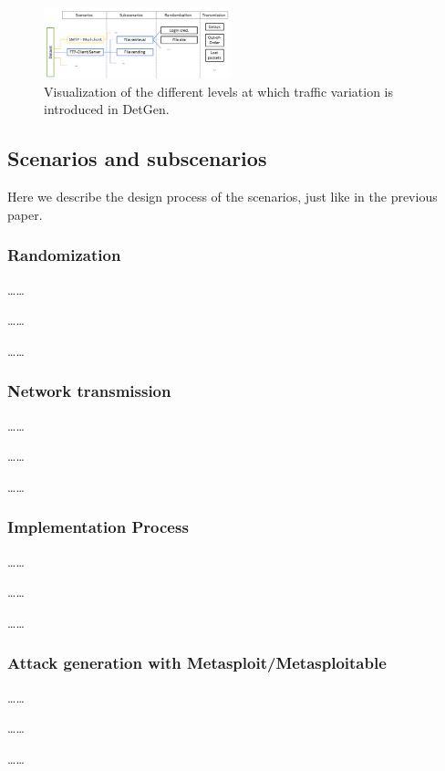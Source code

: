 \documentclass{article}
\begin{document}
\begin{figure}
 \centering 
 \includegraphics[width=0.480\textwidth]{images/scenario_branching.PNG}
 \caption{Visualization of the different levels at which traffic variation is introduced in DetGen.}
 \label{Fig:branching}
\end{figure}


\subsection{Scenarios and subscenarios}
\label{Sec:Scenarios}
Here we describe the design process of the scenarios, just like in the previous paper.

\subsubsection{Randomization}\label{Sec:randomsubscen}
\dots \dots

\dots \dots

\dots \dots
\subsubsection{Network transmission}\label{Sec:Netrand}
\dots \dots

\dots \dots

\dots \dots

\subsubsection{Implementation Process}
\dots \dots

\dots \dots

\dots \dots

\subsubsection{Attack generation with Metasploit/Metasploitable}
\dots \dots

\dots \dots

\dots \dots
 
\end{document}
